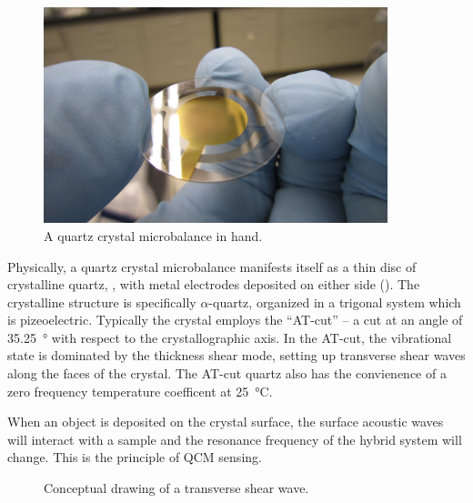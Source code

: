 \begin{figure}[ht]
 \centering
 \includegraphics[keepaspectratio,width=10cm]{qcm/figures/qcm_holding.jpg}
 \caption{A quartz crystal microbalance in hand.}
 \label{fig:qcmholding}
\end{figure}
Physically, a quartz crystal microbalance manifests itself as a thin disc
of crystalline quartz, , with metal electrodes deposited on either
side ().  The crystalline structure is specifically
$\alpha$-quartz, organized in a trigonal system which is pizeoelectric.
Typically the crystal employs the ``AT-cut'' -- a cut at an angle of
\SI{35.25}{\degree} with respect to the crystallographic axis.  In the
AT-cut, the vibrational state is dominated by the thickness shear mode,
setting up transverse shear waves along the faces of the crystal.  The
AT-cut quartz also has the convienence of a zero frequency
temperature coefficent at \SI{25}{\celsius}.

When an object is deposited on the crystal surface, the surface acoustic
waves will interact with a sample and the resonance frequency of the hybrid
system will change.  This is the principle of QCM sensing.
\begin{figure}[ht]
 \centering
	\caption{Conceptual drawing of a transverse shear wave.}
 \label{fig:qcmtsm}
\end{figure}

